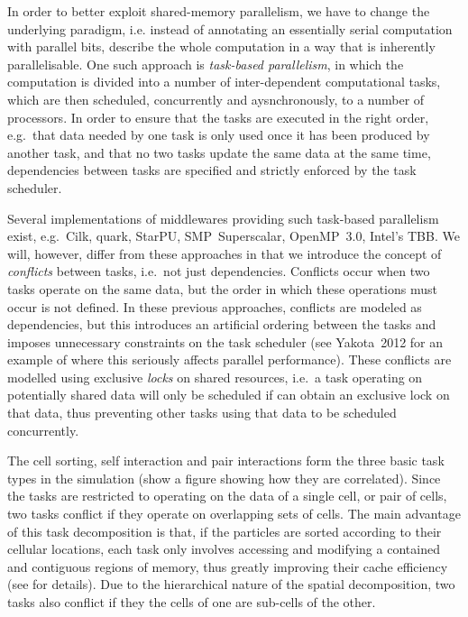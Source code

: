 \documentclass[final]{siamltex}
\begin{document}
In order to better exploit shared-memory parallelism, 
we have to change the underlying paradigm, i.e. instead
of annotating an essentially serial computation with parallel
bits, describe the whole computation in a way that
is inherently parallelisable.
One such approach is {\em task-based parallelism}, in which the
computation is divided into a number of inter-dependent
computational tasks, which are then scheduled, concurrently
and aysnchronously, to a number of processors.
In order to ensure that the tasks are executed in the right
order, e.g.~that data needed by one task is only used once it
has been produced by another task, and that no two tasks
update the same data at the same time, dependencies between
tasks are specified and strictly enforced by the task
scheduler.

Several implementations of middlewares providing such task-based
parallelism exist, e.g.~Cilk, {\sc quark},
StarPU, SMP~Superscalar, OpenMP~3.0, Intel's TBB.
We will, however, differ from these approaches in that we introduce the
concept of {\em conflicts} between tasks, i.e.~not just dependencies.
Conflicts occur when two tasks operate on the same data, 
but the order in which these operations must occur is not defined.
In these previous approaches, conflicts are modeled as dependencies,
but this introduces an artificial ordering between the tasks
and imposes unnecessary constraints on the task scheduler
(see Yakota~2012 for an example of where this seriously
affects parallel performance).
These conflicts are modelled using exclusive {\em locks} on shared
resources, i.e.~a task operating on potentially shared data will
only be scheduled if can obtain an exclusive lock on that data,
thus preventing other tasks using that data to be scheduled concurrently.

The cell sorting, self interaction and pair interactions form
the three basic task types in the simulation (show a figure
showing how they are correlated).
Since the tasks are restricted to operating on the data of a
single cell, or pair of cells, two tasks conflict if they
operate on overlapping sets of cells.
The main advantage of this task decomposition is that, if
the particles are sorted according to their cellular locations,
each task only involves accessing and modifying a contained
and contiguous regions of memory, thus greatly improving their
cache efficiency (see \cite{ref:Gonnet2012} for details).
Due to the hierarchical nature of the spatial decomposition,
two tasks also conflict if they the cells of one are sub-cells
of the other.
\end{document}
